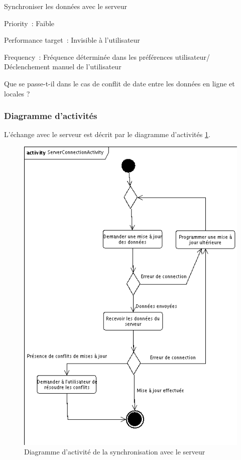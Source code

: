 \begin{usecase}{Synchroniser les données avec le serveur}
\begin{relatedinformation}
\item[Priority~:] Faible
\item[Performance target~:] Invisible à l'utilisateur
\item[Frequency~:] Fréquence déterminée dans les préférences utilisateur/ Déclenchement manuel de l'utilisateur
\\
\end{relatedinformation}
\begin{openissues}
\item Que se passe-t-il dans le cas de conflit de date entre les données en ligne et locales ?
\\
\end{openissues}
\end{usecase}


\subsubsection{Diagramme d'activités}
L'échange avec le serveur est décrit par le diagramme d'activités \ref{connectionActivite}.
\begin{figure}[!ht]
\begin{center}
\includegraphics[width=12cm]{images/connectionActivite.png}
\caption{Diagramme d'activité de la synchronisation avec le serveur}
\label{connectionActivite}
\end{center}
\end{figure}



